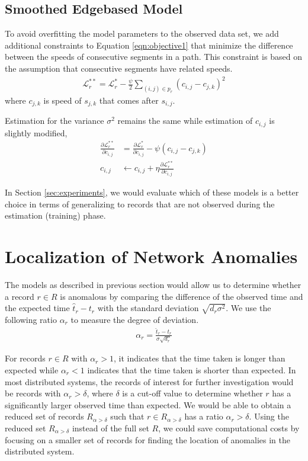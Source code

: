 \documentclass[conference]{IEEEtran.1.8}
\begin{document}
\subsection{Smoothed Edgebased Model}

To avoid overfitting the model parameters to the observed data set, we add additional constraints to Equation \ref{eqn:objective1} that minimize the difference between the speeds of consecutive segments in a path. This constraint is based on the assumption that consecutive segments have related speeds.
\begin{align*}
	\mathcal{L}^{**}_r = \mathcal{L}^*_r - \frac{\psi}{2} \sum_{(i,j) \in p_r} \left( c_{i,j} - c_{j,k} \right)^2
\end{align*}
where $c_{j,k}$ is speed of $s_{j,k}$ that comes after $s_{i,j}$.

Estimation for the variance $\sigma^2$ remains the same while estimation of $c_{i,j}$ is slightly modified,
\begin{align*}
	\frac{\partial \mathcal{L}^{**}_r}{\partial c_{i,j}} &= \frac{\partial \mathcal{L}^*_r}{\partial c_{i,j}} - \psi (c_{i,j} - c_{j,k}) \\
	c_{i,j} &\leftarrow c_{i,j} + \eta \frac{\partial \mathcal{L}^{**}_r}{\partial c_{i,j}}
\end{align*}

In Section \ref{sec:experiments}, we would evaluate which of these models is a better choice in terms of generalizing to records that are not observed during the estimation (training) phase.

\section{Localization of Network Anomalies}
\label{sec:localization}

The models as described in previous section would allow us to determine whether a record $r \in R$ is anomalous by comparing the difference of the observed time and the expected time $\hat{t}_r - t_r$ with the standard deviation $\sqrt{d_r \sigma^2}$. We use the following ratio $\alpha_r$ to measure the degree of deviation.
\begin{align}
	\label{eqn:alpha_ratio}
	\alpha_r = \frac{\hat{t}_r - t_r}{\sigma \sqrt{d_r}}
\end{align}

For records $r \in R$ with $\alpha_r > 1$, it indicates that the time taken is longer than expected while $\alpha_r < 1$ indicates that the time taken is shorter than expected. In most distributed systems, the records of interest for further investigation would be records with $\alpha_r > \delta$, where $\delta$ is a cut-off value to determine whether $r$ has a significantly larger observed time than expected. We would be able to obtain a reduced set of records $R_{\alpha > \delta}$ such that $r \in R_{\alpha > \delta}$ has a ratio $\alpha_r > \delta$. Using the reduced set $R_{\alpha > \delta}$ instead of the full set $R$, we could save computational costs by focusing on a smaller set of records for finding the location of anomalies in the distributed system.
\end{document}
